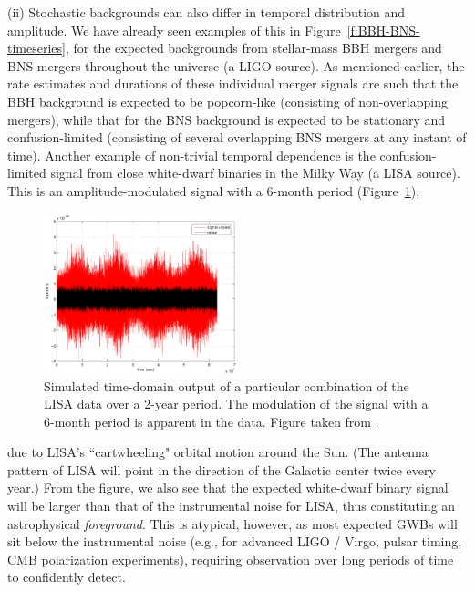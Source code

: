 (ii) Stochastic backgrounds can also differ in 
temporal distribution and amplitude.
We have already seen examples of this in 
Figure~\ref{f:BBH-BNS-timeseries}, for the expected
backgrounds from stellar-mass BBH mergers and 
BNS mergers throughout the universe (a LIGO source).
As mentioned earlier, the rate estimates and 
durations of these individual merger signals are such 
that the BBH background is expected to be popcorn-like 
(consisting of non-overlapping mergers), 
while that for the BNS background is expected to be
stationary and confusion-limited 
(consisting of several overlapping BNS mergers at any
instant of time).
Another example of non-trivial temporal dependence
is the confusion-limited signal from close 
white-dwarf binaries in the Milky Way (a LISA source).
This is an amplitude-modulated signal with 
a 6-month period (Figure~\ref{f:cyclostationary_data}), 
%
\begin{figure}[htbp!]
\begin{center}
\includegraphics[width=0.5\textwidth]{Figures/cyclostationary_data}
\caption{Simulated time-domain output of a particular 
combination of the LISA data over a 2-year period.
The modulation of the signal with a 6-month period
is apparent in the data.
Figure taken from \cite{Romano-Cornish:2017}.}
\label{f:cyclostationary_data}
\end{center}
\end{figure}
%
due to LISA's ``cartwheeling" orbital motion around 
the Sun.
(The antenna pattern of LISA will point in the direction
of the Galactic center twice every year.) 
From the figure, we also see that the expected 
white-dwarf binary signal will be larger than that 
of the instrumental noise for LISA, thus constituting 
an astrophysical {\em foreground}.
This is atypical, however, as most expected GWBs will sit 
below the instrumental noise (e.g., for advanced LIGO / Virgo,
pulsar timing, CMB polarization experiments), requiring 
observation over long periods of time to confidently detect.

